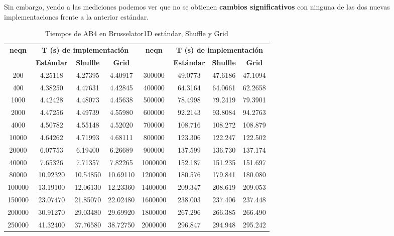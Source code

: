 Sin embargo, yendo a las mediciones podemos ver que no se obtienen \textbf{cambios significativos} con ninguna de las dos nuevas implementaciones frente a la anterior estándar.

\begin{table}[H]
	\centering
	\begin{tabular}{| c | c | c | c || c | c | c | c |}
		\hline
		\multirow{2}{*}{\textbf{neqn}} & \multicolumn{3}{c||}{\textbf{T (s) de implementación}} & 
		\multirow{2}{*}{\textbf{neqn}} & \multicolumn{3}{c|}{\textbf{T (s) de implementación}} \\
		\cline{2-4} \cline{6-8}
		 & \textbf{Estándar} & \textbf{Shuffle} & \textbf{Grid} &
		 & \textbf{Estándar} & \textbf{Shuffle} & \textbf{Grid} \\
		\hline
		
		200      & 4.25118  & 4.27395  & 4.40917  & 300000   & 49.0773  & 47.6186  & 47.1094 \\
		400      & 4.38250  & 4.47631  & 4.42845  & 400000   & 64.3164  & 64.0661  & 62.2658 \\
		1000     & 4.42428  & 4.48073  & 4.45638  & 500000   & 78.4998  & 79.2419  & 79.3901 \\
		2000     & 4.47256  & 4.49739  & 4.55980  & 600000   & 92.2143  & 93.8084  & 94.2763 \\
		4000     & 4.50782  & 4.55148  & 4.52020  & 700000   & 108.716  & 108.272  & 108.879 \\
		10000    & 4.64262  & 4.71993  & 4.68111  & 800000   & 123.306  & 122.247  & 122.502 \\
		20000    & 6.07753  & 6.19400  & 6.26689  & 900000   & 137.599  & 136.730  & 137.174 \\
		40000    & 7.65326  & 7.71357  & 7.82265  & 1000000  & 152.187  & 151.235  & 151.697 \\
		80000    & 10.92320 & 10.54850 & 10.69110 & 1200000  & 180.576  & 179.841  & 180.080 \\
		100000   & 13.19100 & 12.06130 & 12.23360 & 1400000  & 209.347  & 208.619  & 209.053 \\
		150000   & 23.07470 & 21.85070 & 22.02480 & 1600000  & 238.003  & 237.406  & 237.448 \\
		200000   & 30.91270 & 29.03480 & 29.69920 & 1800000  & 267.296  & 266.385  & 266.490 \\
		250000   & 41.32400 & 37.76580 & 38.72750 & 2000000  & 296.847  & 294.948  & 295.242 \\
		\hline
	\end{tabular}
	\caption{Tiempos de AB4 en Brusselator1D estándar, Shuffle y Grid}
	\label{tab:Shuffle-Grid}
\end{table}

